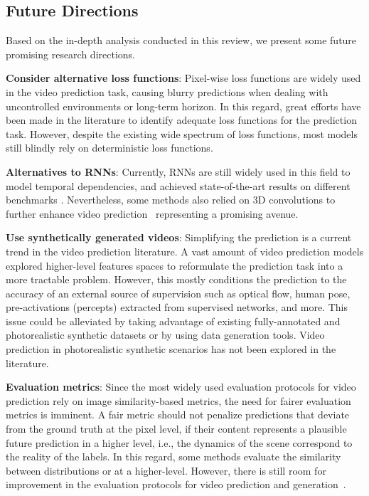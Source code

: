 \subsection{Future Directions}
\label{subsec:future}
Based on the in-depth analysis conducted in this review, we present some future promising research directions.

\vspace*{0.1cm}\noindent\textbf{Consider alternative loss functions}: Pixel-wise loss functions are widely used in the video prediction task, causing blurry predictions when dealing with uncontrolled environments or long-term horizon. In this regard, great efforts have been made in the literature to identify adequate loss functions for the prediction task. However, despite the existing wide spectrum of loss functions, most models still blindly rely on deterministic loss functions.

\vspace*{0.1cm}\noindent\textbf{Alternatives to \acp{RNN}}: Currently, \acp{RNN} are still widely used in this field to model temporal dependencies, and achieved state-of-the-art results on different benchmarks \cite{Oliu2018,Wang2018,Wang2017,Wang2019b}. Nevertheless, some methods also relied on 3D convolutions to further enhance video prediction~\cite{Wang2019b,Chiu2019} representing a promising avenue.

\vspace*{0.1cm}\noindent\textbf{Use synthetically generated videos}: Simplifying the prediction is a current trend in the video prediction literature. A vast amount of video prediction models explored higher-level features spaces to reformulate the prediction task into a more tractable problem. However, this mostly conditions the prediction to the accuracy of an external source of supervision such as optical flow, human pose, pre-activations (percepts) extracted from supervised networks, and more. This issue could be alleviated by taking advantage of existing fully-annotated and photorealistic synthetic datasets or by using data generation tools. Video prediction in photorealistic synthetic scenarios has not been explored in the literature.

\vspace*{0.1cm}\noindent\textbf{Evaluation metrics}: Since the most widely used evaluation protocols for video prediction rely on image similarity-based metrics, the need for fairer evaluation metrics is imminent. A fair metric should not penalize predictions that deviate from the ground truth at the pixel level, if their content represents a plausible future prediction in a higher level, i.e., the dynamics of the scene correspond to the reality of the labels. In this regard, some methods evaluate the similarity between distributions or at a higher-level. However, there is still room for improvement in the evaluation protocols for video prediction and generation~\cite{Theis2016}.

